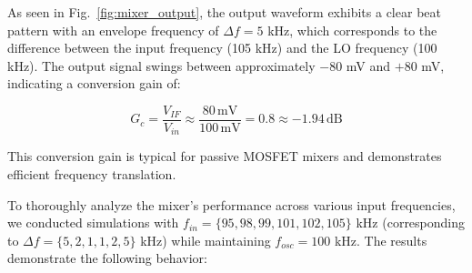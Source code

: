 As seen in Fig.~\ref{fig:mixer_output}, the output waveform exhibits a clear beat pattern with an envelope frequency of $\Delta f = 5$ kHz, which corresponds to the difference between the input frequency (105 kHz) and the LO frequency (100 kHz). The output signal swings between approximately $-80$ mV and $+80$ mV, indicating a conversion gain of:

$$
G_c = \frac{V_{IF}}{V_{in}} \approx \frac{80\,\text{mV}}{100\,\text{mV}} = 0.8 \approx -1.94\,\text{dB}
$$

This conversion gain is typical for passive MOSFET mixers and demonstrates efficient frequency translation.

To thoroughly analyze the mixer's performance across various input frequencies, we conducted simulations with $f_{in} = \{95, 98, 99, 101, 102, 105\}$ kHz (corresponding to $\Delta f = \{5, 2, 1, 1, 2, 5\}$ kHz) while maintaining $f_{osc} = 100$ kHz. The results demonstrate the following behavior:


